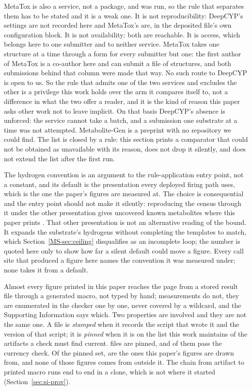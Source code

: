 \documentclass[journal=jcisd8,manuscript=suppinfo,layout=onecolumn]{achemso}
\begin{document}
MetaTox is also a service, not a package, and was run, so the rule that separates them has
to be stated and it is a weak one. It is not reproducibility: DeepCYP's settings are not
recorded here and MetaTox's are, in the deposited file's own configuration block. It is not
availability: both are reachable. It is access, which belongs here to one submitter and to neither service.
MetaTox takes one structure at a time through a form for every submitter but one: the first author
of MetaTox is a co-author here and can submit a file of structures, and both submissions behind
that column were made that way. No such route to DeepCYP is open to us. So the rule that admits
one of the two services and excludes the other is a privilege this work holds over the arm it
compares itself to, not a difference in what the two offer a reader, and it is the kind of reason
this paper asks other work not to leave implicit.
On that basis DeepCYP's absence is unforced: the service cannot take a batch, and a submission
one substrate at a time was not attempted. Metabolite-Gen \citep{Chavan_2026} is a preprint with no
repository we could
find. The list is closed by a rule: this section prints a comparator that could not be obtained as
unavailable with its reason, does not drop it silently, and does not extend the list after the
first run.

The hydrogen convention is an argument to the rule-application entry point, not a
constant, and its default is the presentation every deployed firing path uses, which is the one the
paper's figures are measured at. The choice is consequential and the entry point should not make it
silently: reproducing the census through it under the other presentation gives
\numHydUncoveredexpanded{} uncovered known metabolites where this paper prints \numCeilingUncovered{}. That
other
presentation is not an alternative reading of the bound. It expands the substrate's hydrogens
without completing the templates to match, which Section~\ref{MS-sec:ceiling} disqualifies as an
incomplete loop; the number is quoted here only to show how far a silent
default could move a figure. Every call site
that produced a figure here names the convention it was measured under; none takes it from
a default.

Almost every figure printed in this paper reaches the page from a stored result file through a
generated macro, not typed by hand; \numProvHandtyped{} measurements do not, they are enumerated
in the checker one by one, never covered by a wildcard, and the Supporting Information says which.
Two properties are involved and they are not the same one. A file is \emph{stamped} when it
records the script that wrote it and the version of that script; it is \emph{pinned} when it is on
the list this work maintains of the artifacts a check must find current. \numProvPinned{} files are
pinned, and \numProvPinnedcurrent{} of them pass the currency check. Of the pinned set,
\numProvSources{} are the ones this paper's figures are drawn from, and none of those figures comes
from outside it.
 The chain from artifact to printed
macro runs end to end in a clone, which is not where it started
(Section~\ref{sec:si-prov}).
\end{document}
